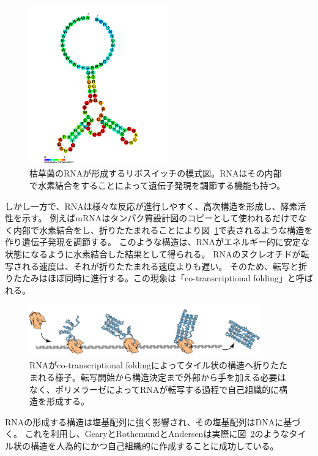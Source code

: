 \documentclass[a4,11pt]{article}
\begin{document}
\begin{figure}[tb]
	\centering
	\includegraphics[width=6cm]{fig/cp/RF00167.jpg}
	\caption{枯草菌のRNAが形成するリボスイッチの模式図。RNAはその内部で水素結合をすることによって遺伝子発現を調節する機能も持つ。}
	\label{fig:riboswitch}
\end{figure}

しかし一方で、RNAは様々な反応が進行しやすく、高次構造を形成し、酵素活性を示す。
例えばmRNAはタンパク質設計図のコピーとして使われるだけでなく内部で水素結合をし、折りたたまれることにより図~\ref{fig:riboswitch}で表されるような構造を作り遺伝子発現を調節する\cite{direct}。
このような構造は、RNAがエネルギー的に安定な状態になるように水素結合した結果として得られる。
RNAのヌクレオチドが転写される速度は、それが折りたたまれる速度よりも遅い\cite{encoding}。
そのため、転写と折りたたみはほぼ同時に進行する。この現象は「co-transcriptional folding」と呼ばれる。

\begin{figure}[tb]
	\centering
	\includegraphics[width=10cm]{fig/cp/rna_origami.pdf}
	\caption{RNAがco-transcriptional foldingによってタイル状の構造へ折りたたまれる様子。転写開始から構造決定まで外部から手を加える必要はなく、ポリメラーゼによってRNAが転写する過程で自己組織的に構造を形成する。}
	\label{fig:rnaorigami}
\end{figure}

RNAの形成する構造は塩基配列に強く影響され、その塩基配列はDNAに基づく。
これを利用し、GearyとRothemundとAndersenは実際に図~\ref{fig:rnaorigami}のようなタイル状の構造を人為的にかつ自己組織的に作成することに成功している\cite{rnaorigami}。
\end{document}
